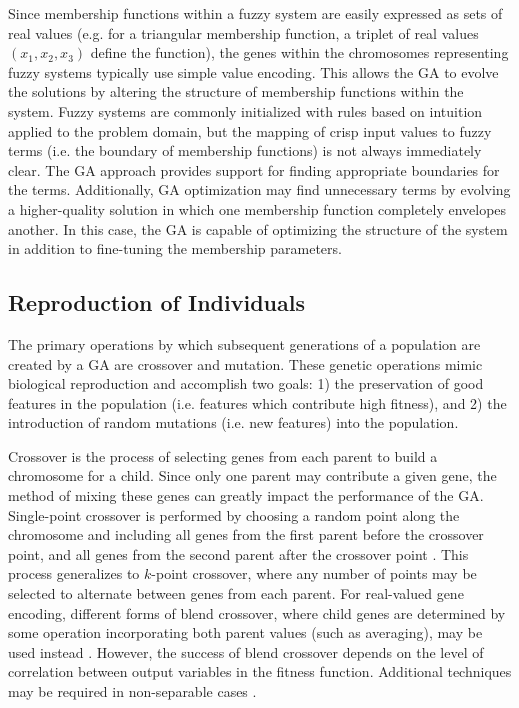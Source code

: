 \documentclass[12pt]{report}
\begin{document}
Since membership functions within a fuzzy system are easily expressed as sets of real values (e.g. for a triangular membership function, a triplet of real values $(x_1, x_2, x_3)$ define the function), the genes within the chromosomes representing fuzzy systems typically use simple value encoding. This allows the GA to evolve the solutions by altering the structure of membership functions within the system. Fuzzy systems are commonly initialized with rules based on intuition applied to the problem domain, but the mapping of crisp input values to fuzzy terms (i.e. the boundary of membership functions) is not always immediately clear. The GA approach provides support for finding appropriate boundaries for the terms. Additionally, GA optimization may find unnecessary terms by evolving a higher-quality solution in which one membership function completely envelopes another. In this case, the GA is capable of optimizing the structure of the system in addition to fine-tuning the membership parameters.

\subsection{Reproduction of Individuals}
The primary operations by which subsequent generations of a population are created by a GA are crossover and mutation. These genetic operations mimic biological reproduction and accomplish two goals: 1) the preservation of good features in the population (i.e. features which contribute high fitness), and 2) the introduction of random mutations (i.e. new features) into the population. 

Crossover is the process of selecting genes from each parent to build a chromosome for a child. Since only one parent may contribute a given gene, the method of mixing these genes can greatly impact the performance of the GA. Single-point crossover is performed by choosing a random point along the chromosome and including all genes from the first parent before the crossover point, and all genes from the second parent after the crossover point \cite{holland1992genetic}. This process generalizes to $k$-point crossover, where any number of points may be selected to alternate between genes from each parent. For real-valued gene encoding, different forms of blend crossover, where child genes are determined by some operation incorporating both parent values (such as averaging), may be used instead \cite{eshelman1993real}. However, the success of blend crossover depends on the level of correlation between output variables in the fitness function. Additional techniques may be required in non-separable cases \cite{takahashi2001crossover, buche2005accelerating}.
\end{document}
